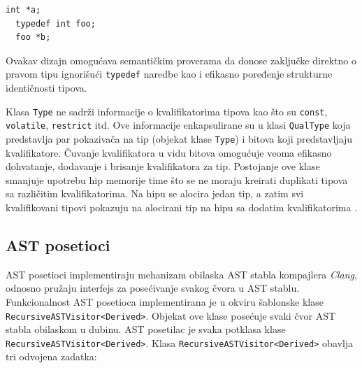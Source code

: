 \documentclass[12pt,oneside]{memoir}
\begin{document}
\begin{lstlisting}[style=customc, caption={Primer kanonskog tipa (\texttt{int *}) i tipa koji nije kanonski (\texttt{foo *}). },label=lst:label5]
  int *a;
  typedef int foo;
  foo *b;
\end{lstlisting}
  Ovakav dizajn omogu\'{c}ava semanti\v{c}kim proverama da donose zaklju\v{c}ke direktno o pravom tipu ignori\v{s}u\'{c}i \texttt{typedef} naredbe kao i efikasno poređenje strukturne identi\v{c}nosti tipova.

  \par
  Klasa \texttt{Type} ne sadr\v{z}i informacije o kvalifikatorima tipova kao \v{s}to su \texttt{const}, \texttt{volatile}, \texttt{restrict} itd. Ove informacije enkapsulirane su u klasi \texttt{QualType} koja predstavlja par pokaziva\v{c}a na tip (objekat klase \texttt{Type}) i bitova koji predstavljaju
  kvalifikatore. \v{C}uvanje kvalifikatora u vidu bitova omogu\'{c}uje veoma efikasno dohvatanje, dodavanje i brisanje kvalifikatora za tip. Postojanje ove klase smanjuje upotrebu hip memorije time \v{s}to se ne moraju kreirati duplikati tipova sa razli\v{c}itim kvalifikatorima. Na hipu se alocira jedan tip, a zatim 
  svi kvalifikovani tipovi pokazuju na alocirani tip na hipu sa dodatim kvalifikatorima \cite{CFEWebsite}.

\subsection{AST posetioci}
AST posetioci implementiraju mehanizam obilaska AST stabla kompajlera \textit{Clang}, odnosno pru\v{z}aju interfejs
za pose\'{c}ivanje svakog \v{c}vora u AST stablu.
Funkcionalnost AST posetioca implementirana je u okviru šablonske klase  \\\texttt{RecursiveASTVisitor<Derived>}.
Objekat ove klase posećuje svaki čvor AST stabla obilaskom u dubinu.
AST posetilac je svaka potklasa klase \\ \texttt{RecursiveASTVisitor<Derived>}.
Klasa \texttt{RecursiveASTVisitor<Derived>} obavlja tri odvojena zadatka:
\end{document}
